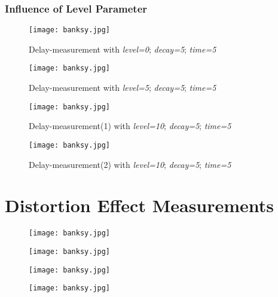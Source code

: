 \subsubsection{Influence of Level Parameter}

\begin{figure}[H]
	\centering \texttt{[image: banksy.jpg]}
	\caption[Menu]{Delay-measurement with \textit{level=0}; \textit{decay=5}; \textit{time=5}}
	\label{fig:DelayExemplevel550}
\end{figure}

\begin{figure}[H]
	\centering \texttt{[image: banksy.jpg]}
	\caption[Menu]{Delay-measurement with \textit{level=5}; \textit{decay=5}; \textit{time=5}}
	\label{fig:DelayExemplevel555}
\end{figure}

\begin{figure}[H]
	\centering \texttt{[image: banksy.jpg]}
	\caption[Menu]{Delay-measurement(1) with \textit{level=10}; \textit{decay=5}; \textit{time=5}}
	\label{fig:DelayExemplevel5510}
\end{figure}

\begin{figure}[H]
	\centering \texttt{[image: banksy.jpg]}
	\caption[Menu]{Delay-measurement(2) with \textit{level=10}; \textit{decay=5}; \textit{time=5}}
	\label{fig:DelayExemplevel5510}
\end{figure}



\section{Distortion Effect Measurements}\label{DistortionAppendix}

\begin{figure}[H]
\begin{minipage}[t]{0.5\textwidth}
\texttt{[image: banksy.jpg]}
\end{minipage}
\begin{minipage}[t]{0.5\textwidth}
\texttt{[image: banksy.jpg]}
\end{minipage}
\end{figure}



\begin{figure}[H]
\begin{minipage}[t]{0.5\textwidth}
\texttt{[image: banksy.jpg]}
\end{minipage}
\begin{minipage}[t]{0.5\textwidth}
\texttt{[image: banksy.jpg]}
\end{minipage}
\end{figure}


